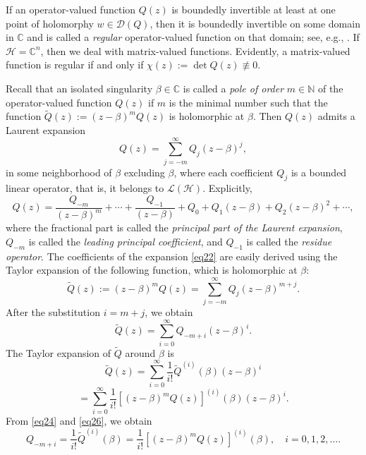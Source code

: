 \documentclass[11pt, reqno]{amsart}
\theoremstyle{plain}
\theoremstyle{remark}
\numberwithin{equation}{section}
\begin{document}
If an operator-valued function $Q(z)$ is boundedly invertible at least at one point of holomorphy $w \in \mathcal{D}(Q)$, then it is boundedly invertible on some domain in $\mathbb{C}$ and is called a \textit{regular} operator-valued function on that domain; see, e.g., \cite[p.~327]{Lu4}. If $\mathcal{H} = \mathbb{C}^{n}$, then we deal with matrix-valued functions. Evidently, a matrix-valued function is regular if and only if $\chi(z) := \det Q(z) \not\equiv 0$.

Recall that an isolated singularity $\beta \in \mathbb{C}$ is called a \textit{pole of order} $m \in \mathbb{N}$ of the operator-valued function $Q(z)$ if $m$ is the minimal number such that the function $\tilde{Q}(z) := (z-\beta)^{m} Q(z)$ is holomorphic at $\beta$. Then $Q(z)$ admits a Laurent expansion
\[
Q(z) = \sum_{j = -m}^{\infty} Q_{j} (z- \beta)^{j},
\]
in some neighborhood of $\beta$ excluding $\beta$, where each coefficient $Q_j$ is a bounded linear operator, that is, it belongs to $\mathcal{L}(\mathcal{H})$. Explicitly,
\begin{equation}
\label{eq22}
Q(z) = \frac{Q_{-m}}{(z- \beta)^{m}} + \cdots + \frac{Q_{-1}}{(z- \beta)} + Q_{0} + Q_{1}(z- \beta) + Q_{2}(z- \beta)^{2} + \cdots ,
\end{equation}
where the fractional part is called the \textit{principal part of the Laurent expansion}, $Q_{-m}$ is called the \textit{leading principal coefficient}, and $Q_{-1}$ is called the \textit{residue operator}. The coefficients of the expansion \eqref{eq22} are easily derived using the Taylor expansion of the following function, which is holomorphic at $\beta$:
\[
\tilde{Q}(z) := (z- \beta)^{m} Q(z) = \sum_{j = -m}^{\infty} Q_{j} (z- \beta)^{m+j}.
\]
After the substitution $i = m + j$, we obtain
\begin{equation}
\label{eq24}
\tilde{Q}(z) = \sum_{i = 0}^{\infty} Q_{-m+i} (z- \beta)^{i}.
\end{equation}
The Taylor expansion of $\tilde{Q}$ around $\beta$ is
\begin{equation}
\label{eq26}
\tilde{Q}(z) = \sum_{i = 0}^{\infty} \frac{1}{i!} \tilde{Q}^{(i)}(\beta) (z- \beta)^{i}
\end{equation}
\[
= \sum_{i = 0}^{\infty} \frac{1}{i!} \left[(z- \beta)^{m} Q(z)\right]^{(i)}(\beta) (z- \beta)^{i}.
\]
From \eqref{eq24} and \eqref{eq26}, we obtain
\begin{equation}
\label{eq28}
Q_{-m+i} = \frac{1}{i!} \tilde{Q}^{(i)}(\beta)
= \frac{1}{i!} \left[(z- \beta)^{m} Q(z)\right]^{(i)}(\beta),
\quad i = 0, 1, 2, \ldots .
\end{equation}
\end{document}
